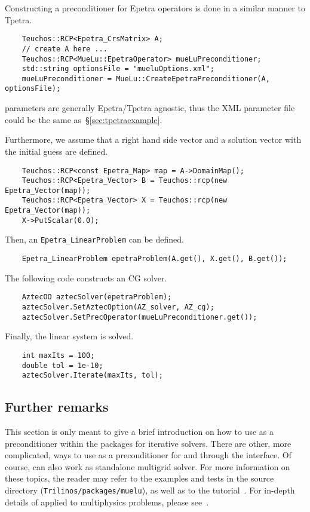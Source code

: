 Constructing a \muelu{} preconditioner for Epetra operators is done in a similar
manner to Tpetra.
\begin{lstlisting}
    Teuchos::RCP<Epetra_CrsMatrix> A;
    // create A here ...
    Teuchos::RCP<MueLu::EpetraOperator> mueLuPreconditioner;
    std::string optionsFile = "mueluOptions.xml";
    mueLuPreconditioner = MueLu::CreateEpetraPreconditioner(A, optionsFile);
\end{lstlisting}
\muelu{} parameters are generally Epetra/Tpetra agnostic, thus the XML parameter file
could be the same as~\S\ref{sec:tpetraexample}.

Furthermore, we assume that a right hand side vector and a solution vector with
the initial guess are defined.
\begin{lstlisting}
    Teuchos::RCP<const Epetra_Map> map = A->DomainMap();
    Teuchos::RCP<Epetra_Vector> B = Teuchos::rcp(new Epetra_Vector(map));
    Teuchos::RCP<Epetra_Vector> X = Teuchos::rcp(new Epetra_Vector(map));
    X->PutScalar(0.0);
\end{lstlisting}

Then, an \texttt{Epetra\_LinearProblem} can be defined.
\begin{lstlisting}
    Epetra_LinearProblem epetraProblem(A.get(), X.get(), B.get());
\end{lstlisting}

The following code constructs an \aztecoo{} CG solver.
\begin{lstlisting}
    AztecOO aztecSolver(epetraProblem);
    aztecSolver.SetAztecOption(AZ_solver, AZ_cg);
    aztecSolver.SetPrecOperator(mueLuPreconditioner.get());
\end{lstlisting}

Finally, the linear system is solved.
\begin{lstlisting}
    int maxIts = 100;
    double tol = 1e-10;
    aztecSolver.Iterate(maxIts, tol);
\end{lstlisting}

\subsection{Further remarks}

This section is only meant to give a brief introduction on how to use \muelu{}
as a preconditioner within the \trilinos{} packages for iterative solvers. There
are other, more complicated, ways to use \muelu{} as a preconditioner for \belos
and \aztecoo through the \xpetra interface. Of course, \muelu{} can also work as
standalone multigrid solver. For more information on these topics, the reader
may refer to the examples and tests in the \muelu{} source directory
(\texttt{Trilinos/packages/muelu}), as well as to the \muelu{} tutorial~\cite{MueLuTutorial}.
For in-depth details of \muelu applied to multiphysics problems, please see~\cite{Wiesner2014}.
